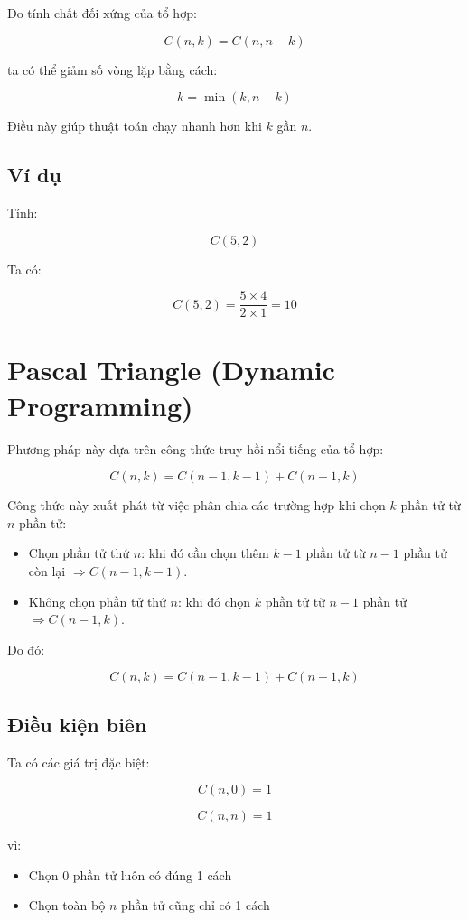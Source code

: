 Do tính chất đối xứng của tổ hợp:

\[
C(n,k) = C(n,n-k)
\]

ta có thể giảm số vòng lặp bằng cách:

\[
k = \min(k, n-k)
\]

Điều này giúp thuật toán chạy nhanh hơn khi $k$ gần $n$.

\subsection*{Ví dụ}

Tính:

\[
C(5,2)
\]

Ta có:

\[
C(5,2) =
\frac{5 \times 4}{2 \times 1}
= 10
\]

\newpage

\section{Pascal Triangle (Dynamic Programming)}

Phương pháp này dựa trên công thức truy hồi nổi tiếng của tổ hợp:

\[
C(n,k) = C(n-1,k-1) + C(n-1,k)
\]

Công thức này xuất phát từ việc phân chia các trường hợp khi chọn $k$ phần tử từ $n$ phần tử:

\begin{itemize}
\item Chọn phần tử thứ $n$: khi đó cần chọn thêm $k-1$ phần tử từ $n-1$ phần tử còn lại $\Rightarrow C(n-1,k-1)$.
\item Không chọn phần tử thứ $n$: khi đó chọn $k$ phần tử từ $n-1$ phần tử $\Rightarrow C(n-1,k)$.
\end{itemize}

Do đó:

\[
C(n,k) = C(n-1,k-1) + C(n-1,k)
\]

\subsection*{Điều kiện biên}

Ta có các giá trị đặc biệt:

\[
C(n,0) = 1
\]

\[
C(n,n) = 1
\]

vì:

\begin{itemize}
\item Chọn 0 phần tử luôn có đúng 1 cách
\item Chọn toàn bộ $n$ phần tử cũng chỉ có 1 cách
\end{itemize}

